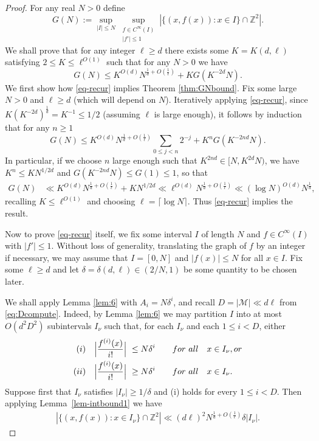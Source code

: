 \documentclass[10pt,a4paper]{amsart}
\newcommand{\Z}{{\mathbb Z}}
\begin{document}
\begin{proof}
For any real $N>0$ define
\[
G(N):= \sup_{|I|\le N} \sup_{\substack{f\in C^\infty(I)\\ \lvert f'\rvert\leq 1}}\left\lvert \big\{(x,f(x)) : x \in I \big\}\cap \Z^2 \right\rvert.\]
We shall prove that for any integer $\ell \geq d$ there exists some $K=K(d,\ell)$ satisfying $2\leq K\leq \ell^{O(1)}$ such that for any $N>0$ we have
\begin{equation}\label{eq-recur}
G(N) \leq K^{O(d)} N^{\frac{1}{d}+O(\frac{1}{\ell})} + KG(K^{-2d}N).
\end{equation}
We first show how \eqref{eq-recur} implies Theorem \ref{thm:GNbound}. Fix some large $N>0$ and $\ell\geq d$ (which will depend on $N$). Iteratively applying \eqref{eq-recur}, since $K(K^{-2d})^{\frac{1}{d}}= K^{-1}\leq  1/2$ (assuming $\ell$ is large enough), it follows by induction that for any $n\geq 1$
\[G(N) \leq K^{O(d)}N^{\frac{1}{d}+O(\frac{1}{\ell})}\sum_{0\leq j<n}2^{-j}+K^nG(K^{-2nd}N).\]
In particular, if we choose $n$ large enough such that $K^{2nd}\in [N,K^{2d}N)$, we have $K^n \leq KN^{1/2d}$ and $G(K^{-2nd}N)\leq G(1)\le 1$, so that
\begin{align*}
G(N) & \ll K^{O(d)}N^{\frac{1}{d}+O(\frac{1}{\ell})}+KN^{1/2d} \ll \ell^{O(d)}N^{\frac{1}{d}+O(\frac{1}{\ell})} \ll(\log N)^{O(d)}N^{\frac{1}{d}},
\end{align*}
recalling $K\leq \ell^{O(1)}$ and choosing $\ell=\lceil \log N\rceil$. Thus \eqref{eq-recur} implies the result.

Now to prove \eqref{eq-recur} itself, we fix some interval $I$ of length $N$ and $f\in C^\infty(I)$ with $\lvert f'\rvert\leq 1$. Without loss of generality, translating the graph of $f$ by an integer if necessary, we may assume that $I=[0,N]$ and $\lvert f(x)\rvert \leq N$ for all $x\in I$. Fix some $\ell\geq d$ and let $\delta=\delta(d,\ell)\in(2/N,1)$ be some quantity to be chosen later. 

We shall apply Lemma \ref{lem:6} with $A_i=N\delta^i$, and  recall $D=|\mathcal M|\ll d\ell$ from \eqref{eq:Dcompute}. Indeed, by Lemma \ref{lem:6} we may partition $I$ into at most $O(d^2D^2)$ subintervals $I_\nu$ such that, for each $I_\nu$ and each $1\le i<D$, either 
\begin{align*}
{\rm (i)} & &\Big|\frac{f^{(i)}(x)}{i!}\Big| \ &\le N\delta^i \qquad {\rm for \ all }\quad x\in I_\nu,\textrm{ or }\\
{\rm (ii)} & &\Big|\frac{f^{(i)}(x)}{i!}\Big| \ &\ge N\delta^i  \qquad {\rm for \ all }\quad x\in I_\nu.
\end{align*}
Suppose first that $I_\nu$ satisfies $\lvert I_\nu\rvert \geq 1/\delta$ and (i) holds for every $1\leq i<D$. Then applying Lemma~\ref{lem-intbound1} we have
\begin{align*}
\left\lvert \big\{ (x,f(x)) : x\in I_\nu\big\}\cap \Z^2\right\rvert\ll
(d\ell)^2 N^{\frac{1}{d}+O(\frac{1}{\ell})}\delta|I_\nu|.
\end{align*}


\end{proof}
\end{document}
